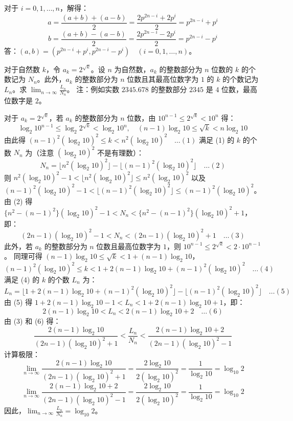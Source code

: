 \begin{questions}
\begin{parts}
\begin{solution}
        对于 $i = 0, 1, \dots, n$，解得：
        \[ a = \frac{(a+b)+(a-b)}{2} = \frac{2p^{2n-i} + 2p^i}{2} = p^{2n-i} + p^i  \]
        \[ b = \frac{(a+b)-(a-b)}{2} = \frac{2p^{2n-i} - 2p^i}{2} = p^{2n-i} - p^i  \]
        答：$(a, b) = (p^{2n-i} + p^i, p^{2n-i} - p^i) \quad (i = 0, 1, \dots, n)$。
    \end{solution}
\end{parts}

\question
对于自然数 $k$，令 $a_k = 2^{\sqrt{k}}$。设 $n$ 为自然数，$a_k$ 的整数部分为 $n$ 位数的 $k$ 的个数记为 $N_n$。此外，$a_k$ 的整数部分为 $n$ 位数且其最高位数字为 $1$ 的 $k$ 的个数记为 $L_n$。求 $\lim_{n \to \infty} \frac{L_n}{N_n}$。
注：例如实数 $2345.678$ 的整数部分 $2345$ 是 $4$ 位数，最高位数字是 $2$。
\begin{solution}
    对于 $a_k = 2^{\sqrt{k}}$，若 $a_k$ 的整数部分为 $n$ 位数，由 $10^{n-1} \le 2^{\sqrt{k}} < 10^n$ 得：
    \[
    \log_2 10^{n-1} \le \log_2 2^{\sqrt{k}} < \log_2 10^n, \quad (n-1)\log_2 10 \le \sqrt{k} < n\log_2 10
    \]
    由此得 $(n-1)^2 (\log_2 10)^2 \le k < n^2 (\log_2 10)^2 \quad \dots (1)$
    满足 (1) 的 $k$ 的个数 $N_n$ 为（注意 $(\log_2 10)^2$ 不是有理数）：
    \[
    N_n = \lfloor n^2(\log_2 10)^2 \rfloor - \lfloor (n-1)^2(\log_2 10)^2 \rfloor \quad \dots (2)
    \]
    则 $n^2(\log_2 10)^2 - 1 < \lfloor n^2(\log_2 10)^2 \rfloor \le n^2(\log_2 10)^2$
    以及 $(n-1)^2(\log_2 10)^2 - 1 < \lfloor (n-1)^2(\log_2 10)^2 \rfloor \le (n-1)^2(\log_2 10)^2$。
    由 (2) 得 $\{n^2 - (n-1)^2\}(\log_2 10)^2 - 1 < N_n < \{n^2 - (n-1)^2\}(\log_2 10)^2 + 1$，即：
    \[
    (2n-1)(\log_2 10)^2 - 1 < N_n < (2n-1)(\log_2 10)^2 + 1 \quad \dots (3)
    \]
    此外，若 $a_k$ 的整数部分为 $n$ 位数且最高位数字为 $1$，则 $10^{n-1} \le 2^{\sqrt{k}} < 2 \cdot 10^{n-1}$。
    同理可得 $(n-1)\log_2 10 \le \sqrt{k} < 1 + (n-1)\log_2 10$，
    \[
    (n-1)^2(\log_2 10)^2 \le k < 1 + 2(n-1)\log_2 10 + (n-1)^2(\log_2 10)^2 \quad \dots (4)
    \]
    满足 (4) 的 $k$ 的个数 $L_n$ 为：
    \[
    L_n = \lfloor 1 + 2(n-1)\log_2 10 + (n-1)^2(\log_2 10)^2 \rfloor - \lfloor (n-1)^2(\log_2 10)^2 \rfloor \quad \dots (5)
    \]
    由 (5) 得 $1 + 2(n-1)\log_2 10 - 1 < L_n < 1 + 2(n-1)\log_2 10 + 1$，即：
    \[
    2(n-1)\log_2 10 < L_n < 2(n-1)\log_2 10 + 2 \quad \dots (6)
    \]
    由 (3) 和 (6) 得：
    \[
    \frac{2(n-1)\log_2 10}{(2n-1)(\log_2 10)^2 + 1} < \frac{L_n}{N_n} < \frac{2(n-1)\log_2 10 + 2}{(2n-1)(\log_2 10)^2 - 1}
    \]
    计算极限：
    \[
    \lim_{n \to \infty} \frac{2(n-1)\log_2 10}{(2n-1)(\log_2 10)^2 + 1} = \frac{2\log_2 10}{2(\log_2 10)^2} = \frac{1}{\log_2 10} = \log_{10} 2
    \]
    \[
    \lim_{n \to \infty} \frac{2(n-1)\log_2 10 + 2}{(2n-1)(\log_2 10)^2 - 1} = \frac{2\log_2 10}{2(\log_2 10)^2} = \frac{1}{\log_2 10} = \log_{10} 2
    \]
    因此，$\lim_{n \to \infty} \frac{L_n}{N_n} = \log_{10} 2$。
\end{solution}
\end{questions}
\pagebreak

